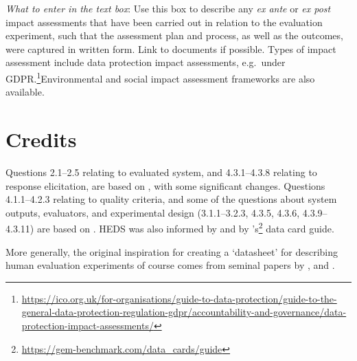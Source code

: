 \documentclass[11pt,a4paper]{article}
\begin{document}
\noindent\textit{What to enter in the text box}: Use this box to describe any \textit{ex ante} or \textit{ex post} impact assessments that have been carried out in relation to the evaluation experiment, such that the assessment plan and process, as well as the outcomes, were captured in written form. Link to documents if possible. Types of impact assessment include data protection impact assessments, e.g.\ under GDPR.\footnote{\footnotesize \url{https://ico.org.uk/for-organisations/guide-to-data-protection/guide-to-the-general-data-protection-regulation-gdpr/accountability-and-governance/data-protection-impact-assessments/}}Environmental and social impact assessment frameworks are also available.


\section*{Credits}

Questions 2.1--2.5 relating to evaluated system, and 4.3.1--4.3.8 relating to response elicitation, are based on \citet{howcroft-etal-2020-twenty}, with some significant changes. Questions 4.1.1--4.2.3 relating to quality criteria, and some of the questions about system outputs, evaluators, and experimental design (3.1.1--3.2.3, 4.3.5, 4.3.6, 4.3.9--4.3.11) are based on \citet{belz-etal-2020-disentangling}. 
HEDS was also informed by \citet{van2019best, vanderlee2021} and by  \citet{gehrmann2021gem}'s\footnote{\footnotesize \url{https://gem-benchmark.com/data\_cards/guide}} data card guide.

More generally, the original inspiration for creating a `datasheet' for describing human evaluation experiments of course comes from seminal papers by \citet{bender-friedman-2018-data}, \citet{mitchell2019modelcards} and \citet{gebru2018datasheets}.



\end{document}
